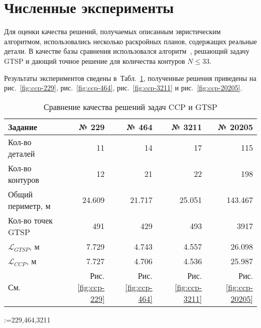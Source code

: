 
\section{Численные эксперименты}
\label{sec:ccp.exp}

Для оценки качества решений,
получаемых описанным
эвристическим алгоритмом,
использовались несколько раскройных планов,
содержащих реальные детали.
В качестве базы сравнения
использовался алгоритм~\cite{bi:RoMa},
решающий задачу GTSP
и дающий точное решение для количества контуров
$N \leqslant 33$.

Результаты экспериментов сведены
в~Табл.~\ref{tab:ccp-vs-gtsp},
полученные решения приведены на
рис.~\ref{fig:ccp-229},
рис.~\ref{fig:ccp-464},
рис.~\ref{fig:ccp-3211}
и рис.~\ref{fig:ccp-20205}.

\begin{table}
  \centering
  \caption{Сравнение качества решений задач CCP и GTSP}
  \label{tab:ccp-vs-gtsp}
  \def\arraystretch{1.2}
  \begin{tabular}{l|*{4}{r}}
      Задание & № 229 & № 464 & № 3211 & № 20205 \\
      \hline
      Кол-во деталей & 11 & 14 & 17 & 115 \\
      Кол-во контуров & 12 & 21 & 22 & 198 \\
      Общий периметр, м & 24.609 & 21.717 & 25.051 & 143.467 \\
      Кол-во точек GTSP & 491 & 429 & 493 & 3917 \\
      $\mathcal L_{GTSP}$, м & 7.729 & 4.743 & 4.557 & 26.098 \\
      $\mathcal L_{CCP}$, м & 7.727 & 4.706 & 4.536  & 25.987 \\
      См. & Рис. \ref{fig:ccp-229} & Рис. \ref{fig:ccp-464} & Рис. \ref{fig:ccp-3211} & Рис. \ref{fig:ccp-20205} \\
      \hline
  \end{tabular}
\end{table}

\makeatletter
  \@for\job:={229,464,3211}
\makeatother

